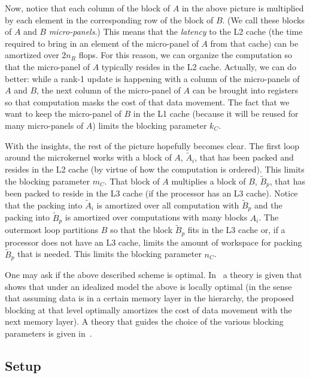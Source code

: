 Now, notice that each column of the block of $ A $ in the above picture is multiplied by each element in the corresponding row of the block of $ B $.  (We call these blocks of $ A $ and $ B $ {\em micro-panels}.)  This means that the {\em latency} to the L2 cache (the time required to bring in an element of the micro-panel of $ A $ from that cache) can be amortized over $ 2n_R $ flops.  For this reason, we can organize the computation so that the micro-panel of $ A $ typically resides in the L2 cache.  Actually, we can do better: while a rank-1 update is happening with a column of the micro-panels of $ A $ and $ B $, the next column of the micro-panel of $ A $ can be brought into registers so that computation masks the cost of that data movement.
The fact that we want to keep the micro-panel of $ B $ in the L1 cache (because it will be reused for many micro-panels of $ A $) limits the blocking parameter $ k_C $.

With the insights, the rest of the picture hopefully becomes clear.
The first loop around the microkernel works with a block of $ A $, $ \widetilde A_i $, that has been packed and resides in the L2 cache (by virtue of how the computation is ordered).  This limits the blocking parameter $ m_C $.  That block of $ A $ multiplies a block of $ B $, $ \widetilde B_p $, that has been packed to reside in the L3 cache (if the processor has an L3 cache).  Notice that the packing into  $ \widetilde A_i $ is amortized over all computation  with $ \widetilde B_p $ and the packing into $ \widetilde B_p $ is amortized over computations with many blocks $ A_i $.  The outermost loop partitions $ B $ so that the block $ \widetilde B_p $ fits in the L3 cache or, if a processor does not have an L3 cache, limits the amount of workspace for packing $ \widetilde B_p $ that is needed.  This limits the blocking parameter $ n_C $.

One may ask if the above described scheme is optimal.  In~\cite{ITXGEMM:ICCS01} a theory is given that shows that under an idealized model the above is locally optimal (in the sense that assuming data is in a certain memory layer in the hierarchy, the proposed blocking at that level optimally amortizes the cost of data movement with the next memory layer).  A theory that guides the choice of the various blocking parameters is given in~\cite{BLIS4}.

\subsection{Setup}

